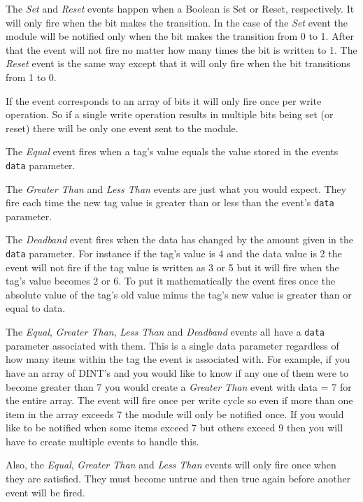 The \textit{Set} and \textit{Reset} events happen when a Boolean is Set or Reset, respectively.  It will only fire when the bit makes the transition.  In the case of the \textit{Set} event the module will be notified only when the bit makes the transition from 0 to 1.  After that the event will not fire no matter how many times the bit is written to 1.  The \textit{Reset} event is the same way except that it will only fire when the bit transitions from 1 to 0.

If the event corresponds to an array of bits it will only fire once per write operation.  So if a single write operation results in multiple bits being set (or reset) there will be only one event sent to the module.

The \textit{Equal} event fires when a tag's value equals the value stored in the events \verb|data| parameter.

The \textit{Greater Than} and \textit{Less Than} events are just what you would expect.  They fire each time the new tag value is greater than or less than the event's \verb|data| parameter.

The \textit{Deadband} event fires when the data has changed by the amount given in the \verb|data| parameter.  For instance if the tag's value is 4 and the data value is 2 the event will not fire if the tag value is written as 3 or 5 but it will fire when the tag's value becomes 2 or 6.  To put it mathematically the event fires once the absolute value of the tag's old value minus the tag's new value is greater than or equal to data.

The \textit{Equal}, \textit{Greater Than}, \textit{Less Than} and \textit{Deadband} events all have a \verb|data| parameter associated with them.  This is a single data parameter regardless of how many items within the tag the event is associated with.  For example, if you have an array of DINT's and you would like to know if any one of them were to become greater than 7 you would create a \textit{Greater Than} event with data = 7 for the entire array.  The event will fire once per write cycle so even if more than one item in the array exceeds 7 the module will only be notified once.  If you would like to be notified when some items exceed 7 but others exceed 9 then you will have to create multiple events to handle this.

Also, the \textit{Equal}, \textit{Greater Than} and \textit{Less Than} events will only fire once when they are satisfied.  They must become untrue and then true again before another event will be fired.

